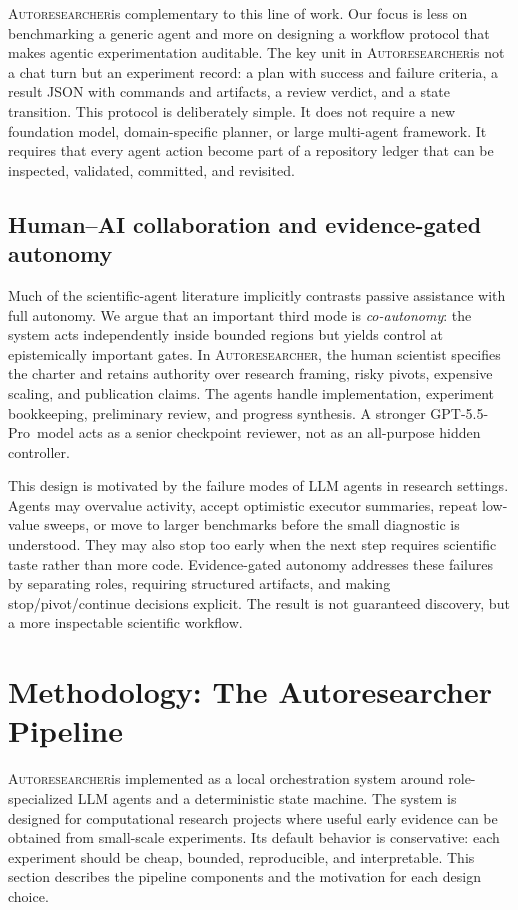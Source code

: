 \documentclass{article}
\newcommand{\sys}{\textsc{Autoresearcher}}
\newcommand{\gptpro}{GPT-5.5-Pro}
\begin{document}
\sys is complementary to this line of work. Our focus is less on benchmarking a generic agent and more on designing a workflow protocol that makes agentic experimentation auditable. The key unit in \sys is not a chat turn but an experiment record: a plan with success and failure criteria, a result JSON with commands and artifacts, a review verdict, and a state transition. This protocol is deliberately simple. It does not require a new foundation model, domain-specific planner, or large multi-agent framework. It requires that every agent action become part of a repository ledger that can be inspected, validated, committed, and revisited.

\subsection{Human--AI collaboration and evidence-gated autonomy}

Much of the scientific-agent literature implicitly contrasts passive assistance with full autonomy. We argue that an important third mode is \emph{co-autonomy}: the system acts independently inside bounded regions but yields control at epistemically important gates. In \sys, the human scientist specifies the charter and retains authority over research framing, risky pivots, expensive scaling, and publication claims. The agents handle implementation, experiment bookkeeping, preliminary review, and progress synthesis. A stronger \gptpro\ model acts as a senior checkpoint reviewer, not as an all-purpose hidden controller.

This design is motivated by the failure modes of LLM agents in research settings. Agents may overvalue activity, accept optimistic executor summaries, repeat low-value sweeps, or move to larger benchmarks before the small diagnostic is understood. They may also stop too early when the next step requires scientific taste rather than more code. Evidence-gated autonomy addresses these failures by separating roles, requiring structured artifacts, and making stop/pivot/continue decisions explicit. The result is not guaranteed discovery, but a more inspectable scientific workflow.

\section{Methodology: The Autoresearcher Pipeline}
\label{sec:method}

\sys is implemented as a local orchestration system around role-specialized LLM agents and a deterministic state machine. The system is designed for computational research projects where useful early evidence can be obtained from small-scale experiments. Its default behavior is conservative: each experiment should be cheap, bounded, reproducible, and interpretable. This section describes the pipeline components and the motivation for each design choice.
\end{document}
